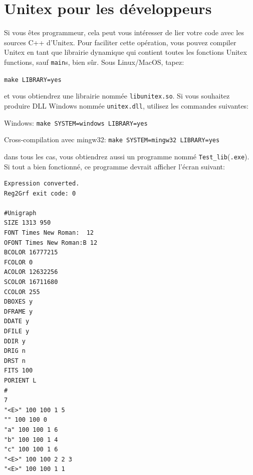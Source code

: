 \section{Unitex pour les développeurs}
\label{section-unitex-developpers}
Si vous êtes programmeur, cela peut vous intéresser de lier votre code avec les sources C++
d'Unitex. Pour faciliter cette opération, vous pouvez compiler Unitex en tant que librairie
dynamique qui contient toutes les fonctions Unitex functions, sauf \verb+main+s, bien sûr. Sous
Linux/MacOS, tapez:

\bigskip
\verb+make LIBRARY=yes+

\bigskip
\noindent et vous obtiendrez une librairie nommée \verb+libunitex.so+. Si vous souhaitez produire 
DLL Windows nommée \verb+unitex.dll+, utilisez les commandes suivantes:

\bigskip
Windows: \verb+make SYSTEM=windows LIBRARY=yes+

Cross-compilation avec mingw32: \verb+make SYSTEM=mingw32 LIBRARY=yes+

\bigskip
\noindent dans tous les cas, vous obtiendrez aussi un programme nommé
\verb+Test_lib+(\verb+.exe+). Si tout a bien fonctionné, ce programme devrait afficher l'écran
suivant:

\begin{verbatim}
Expression converted.
Reg2Grf exit code: 0

#Unigraph
SIZE 1313 950
FONT Times New Roman:  12
OFONT Times New Roman:B 12
BCOLOR 16777215
FCOLOR 0
ACOLOR 12632256
SCOLOR 16711680
CCOLOR 255
DBOXES y
DFRAME y
DDATE y
DFILE y
DDIR y
DRIG n
DRST n
FITS 100
PORIENT L
#
7
"<E>" 100 100 1 5
"" 100 100 0
"a" 100 100 1 6
"b" 100 100 1 4
"c" 100 100 1 6
"<E>" 100 100 2 2 3
"<E>" 100 100 1 1
\end{verbatim}
